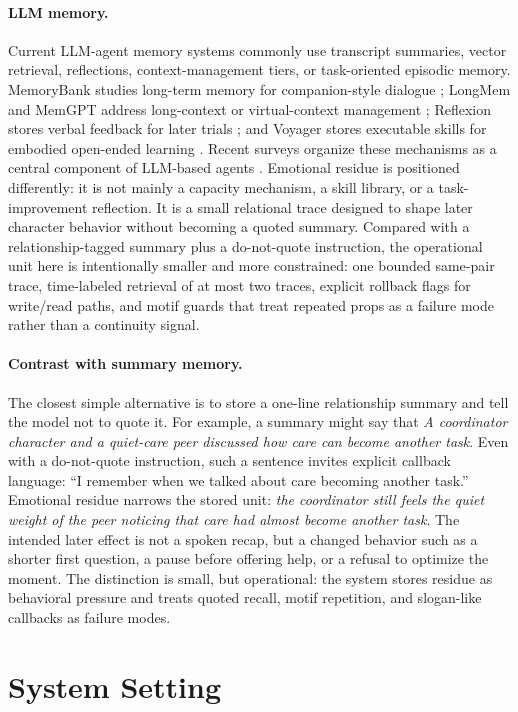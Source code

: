 \documentclass[11pt]{article}
\begin{document}
\paragraph{LLM memory.}
Current LLM-agent memory systems commonly use transcript summaries, vector retrieval, reflections, context-management tiers, or task-oriented episodic memory. MemoryBank studies long-term memory for companion-style dialogue \cite{memorybank}; LongMem and MemGPT address long-context or virtual-context management \cite{longmem,memgpt}; Reflexion stores verbal feedback for later trials \cite{reflexion}; and Voyager stores executable skills for embodied open-ended learning \cite{voyager}. Recent surveys organize these mechanisms as a central component of LLM-based agents \cite{llmagentmemorysurvey}. Emotional residue is positioned differently: it is not mainly a capacity mechanism, a skill library, or a task-improvement reflection. It is a small relational trace designed to shape later character behavior without becoming a quoted summary. Compared with a relationship-tagged summary plus a do-not-quote instruction, the operational unit here is intentionally smaller and more constrained: one bounded same-pair trace, time-labeled retrieval of at most two traces, explicit rollback flags for write/read paths, and motif guards that treat repeated props as a failure mode rather than a continuity signal.

\paragraph{Contrast with summary memory.}
The closest simple alternative is to store a one-line relationship summary and
tell the model not to quote it. For example, a summary might say that
\emph{A coordinator character and a quiet-care peer discussed how care can become another task}. Even with a
do-not-quote instruction, such a sentence invites explicit callback language:
``I remember when we talked about care becoming another task.'' Emotional
residue narrows the stored unit: \emph{the coordinator still feels the quiet weight of
the peer noticing that care had almost become another task}. The intended later
effect is not a spoken recap, but a changed behavior such as a shorter first
question, a pause before offering help, or a refusal to optimize the moment.
The distinction is small, but operational: the system stores residue as
behavioral pressure and treats quoted recall, motif repetition, and slogan-like
callbacks as failure modes.

\section{System Setting}
\end{document}
